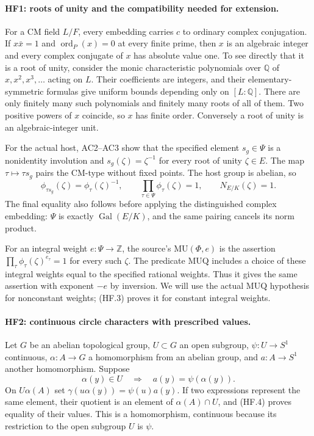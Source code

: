 \paragraph{HF1: roots of unity and the compatibility needed for extension.}
For a CM field $L/F$, every embedding carries $c$ to ordinary
complex conjugation. If $x\bar x=1$ and
$\operatorname{ord}_P(x)=0$ at every finite prime, then $x$ is
an algebraic integer and every complex conjugate of $x$ has
absolute value one. To see directly that it is a root of unity,
consider the monic characteristic polynomials over $\mathbb Q$
of $x,x^2,x^3,\ldots$ acting on $L$. Their coefficients are
integers, and their elementary-symmetric formulas give uniform
bounds depending only on $[L:\mathbb Q]$. There are only finitely
many such polynomials and finitely many roots of all of them.
Two positive powers of $x$ coincide, so $x$ has finite order.
Conversely a root of unity is an algebraic-integer unit.

For the actual host, AC2--AC3 show that the specified element
$s_g\in\Psi$ is a nonidentity involution and
$s_g(\zeta)=\zeta^{-1}$ for every root of unity $\zeta\in E$.
The map $\tau\mapsto\tau s_g$ pairs the CM-type without fixed
points. The host group is abelian, so
\[
 \phi_{\tau s_g}(\zeta)=\phi_\tau(\zeta)^{-1},\qquad
 \prod_{\tau\in\Psi}\phi_\tau(\zeta)=1,\qquad
 N_{E/K}(\zeta)=1.                                    \tag{HF.3}
\]
The final equality also follows before applying the distinguished
complex embedding: $\Psi$ is exactly $\operatorname{Gal}(E/K)$,
and the same pairing cancels its norm product.

For an integral weight $e:\Psi\to\mathbb Z$, the source's
$\mathrm{MU}(\Phi,e)$ is the assertion
$\prod_\tau\phi_\tau(\zeta)^{e_\tau}=1$ for every such $\zeta$.
The predicate $\mathrm{MUQ}$ includes a choice of these integral
weights equal to the specified rational weights. Thus it gives
the same assertion with exponent $-e$ by inversion. We will use
the actual $\mathrm{MUQ}$ hypothesis for nonconstant weights;
(HF.3) proves it for constant integral weights.

\paragraph{HF2: continuous circle characters with prescribed values.}
Let $G$ be an abelian topological group, $U\subset G$ an open
subgroup, $\psi:U\to S^1$ continuous, $\alpha:A\to G$ a
homomorphism from an abelian group, and $a:A\to S^1$ another
homomorphism. Suppose
\[
       \alpha(y)\in U\quad\Longrightarrow\quad
                    a(y)=\psi(\alpha(y)).             \tag{HF.4}
\]
On $U\alpha(A)$ set
$\gamma(u\alpha(y))=\psi(u)a(y)$.
If two expressions represent the same element, their quotient
is an element of $\alpha(A)\cap U$, and (HF.4) proves equality
of their values. This is a homomorphism, continuous because its
restriction to the open subgroup $U$ is $\psi$.

